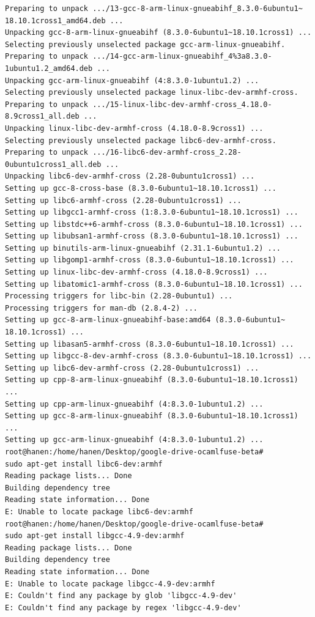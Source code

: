 \begin{verbatim}
Preparing to unpack .../13-gcc-8-arm-linux-gnueabihf_8.3.0-6ubuntu1~
18.10.1cross1_amd64.deb ...
Unpacking gcc-8-arm-linux-gnueabihf (8.3.0-6ubuntu1~18.10.1cross1) ...
Selecting previously unselected package gcc-arm-linux-gnueabihf.
Preparing to unpack .../14-gcc-arm-linux-gnueabihf_4%3a8.3.0-
1ubuntu1.2_amd64.deb ...
Unpacking gcc-arm-linux-gnueabihf (4:8.3.0-1ubuntu1.2) ...
Selecting previously unselected package linux-libc-dev-armhf-cross.
Preparing to unpack .../15-linux-libc-dev-armhf-cross_4.18.0-
8.9cross1_all.deb ...
Unpacking linux-libc-dev-armhf-cross (4.18.0-8.9cross1) ...
Selecting previously unselected package libc6-dev-armhf-cross.
Preparing to unpack .../16-libc6-dev-armhf-cross_2.28-
0ubuntu1cross1_all.deb ...
Unpacking libc6-dev-armhf-cross (2.28-0ubuntu1cross1) ...
Setting up gcc-8-cross-base (8.3.0-6ubuntu1~18.10.1cross1) ...
Setting up libc6-armhf-cross (2.28-0ubuntu1cross1) ...
Setting up libgcc1-armhf-cross (1:8.3.0-6ubuntu1~18.10.1cross1) ...
Setting up libstdc++6-armhf-cross (8.3.0-6ubuntu1~18.10.1cross1) ...
Setting up libubsan1-armhf-cross (8.3.0-6ubuntu1~18.10.1cross1) ...
Setting up binutils-arm-linux-gnueabihf (2.31.1-6ubuntu1.2) ...
Setting up libgomp1-armhf-cross (8.3.0-6ubuntu1~18.10.1cross1) ...
Setting up linux-libc-dev-armhf-cross (4.18.0-8.9cross1) ...
Setting up libatomic1-armhf-cross (8.3.0-6ubuntu1~18.10.1cross1) ...
Processing triggers for libc-bin (2.28-0ubuntu1) ...
Processing triggers for man-db (2.8.4-2) ...
Setting up gcc-8-arm-linux-gnueabihf-base:amd64 (8.3.0-6ubuntu1~
18.10.1cross1) ...
Setting up libasan5-armhf-cross (8.3.0-6ubuntu1~18.10.1cross1) ...
Setting up libgcc-8-dev-armhf-cross (8.3.0-6ubuntu1~18.10.1cross1) ...
Setting up libc6-dev-armhf-cross (2.28-0ubuntu1cross1) ...
Setting up cpp-8-arm-linux-gnueabihf (8.3.0-6ubuntu1~18.10.1cross1) ...
Setting up cpp-arm-linux-gnueabihf (4:8.3.0-1ubuntu1.2) ...
Setting up gcc-8-arm-linux-gnueabihf (8.3.0-6ubuntu1~18.10.1cross1) ...
Setting up gcc-arm-linux-gnueabihf (4:8.3.0-1ubuntu1.2) ...
root@hanen:/home/hanen/Desktop/google-drive-ocamlfuse-beta# 
sudo apt-get install libc6-dev:armhf
Reading package lists... Done
Building dependency tree       
Reading state information... Done
E: Unable to locate package libc6-dev:armhf
root@hanen:/home/hanen/Desktop/google-drive-ocamlfuse-beta# 
sudo apt-get install libgcc-4.9-dev:armhf
Reading package lists... Done
Building dependency tree       
Reading state information... Done
E: Unable to locate package libgcc-4.9-dev:armhf
E: Couldn't find any package by glob 'libgcc-4.9-dev'
E: Couldn't find any package by regex 'libgcc-4.9-dev'

\end{verbatim}

